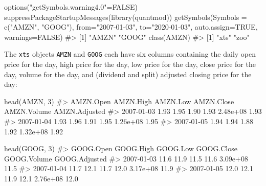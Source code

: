\documentclass[
  letterpaper,
  DIV=11,
  numbers=noendperiod]{scrreprt}
\newenvironment{Shaded}{\begin{snugshade}}{\end{snugshade}}
\newcommand{\AttributeTok}[1]{\textcolor[rgb]{0.40,0.45,0.13}{#1}}
\newcommand{\CommentTok}[1]{\textcolor[rgb]{0.37,0.37,0.37}{#1}}
\newcommand{\ConstantTok}[1]{\textcolor[rgb]{0.56,0.35,0.01}{#1}}
\newcommand{\DecValTok}[1]{\textcolor[rgb]{0.68,0.00,0.00}{#1}}
\newcommand{\FunctionTok}[1]{\textcolor[rgb]{0.28,0.35,0.67}{#1}}
\newcommand{\NormalTok}[1]{\textcolor[rgb]{0.00,0.23,0.31}{#1}}
\newcommand{\OtherTok}[1]{\textcolor[rgb]{0.00,0.23,0.31}{#1}}
\newcommand{\StringTok}[1]{\textcolor[rgb]{0.13,0.47,0.30}{#1}}
\theoremstyle{definition}
\theoremstyle{definition}
\theoremstyle{remark}
\begin{document}
\begin{Shaded}
\begin{Highlighting}[]
\FunctionTok{options}\NormalTok{(}\StringTok{"getSymbols.warning4.0"}\OtherTok{=}\ConstantTok{FALSE}\NormalTok{)}
\FunctionTok{suppressPackageStartupMessages}\NormalTok{(}\FunctionTok{library}\NormalTok{(quantmod))}
\FunctionTok{getSymbols}\NormalTok{(}\AttributeTok{Symbols =} \FunctionTok{c}\NormalTok{(}\StringTok{"AMZN"}\NormalTok{, }\StringTok{"GOOG"}\NormalTok{), }\AttributeTok{from=}\StringTok{"2007{-}01{-}03"}\NormalTok{, }\AttributeTok{to=}\StringTok{"2020{-}01{-}03"}\NormalTok{,}
           \AttributeTok{auto.assign=}\ConstantTok{TRUE}\NormalTok{, }\AttributeTok{warnings=}\ConstantTok{FALSE}\NormalTok{)}
\CommentTok{\#\textgreater{} [1] "AMZN" "GOOG"}
\FunctionTok{class}\NormalTok{(AMZN)}
\CommentTok{\#\textgreater{} [1] "xts" "zoo"}
\end{Highlighting}
\end{Shaded}

The \texttt{xts} objects \texttt{AMZN} and \texttt{GOOG} each have six
columns containing the daily open price for the day, high price for the
day, low price for the day, close price for the day, volume for the day,
and (dividend and split) adjusted closing price for the day:

\begin{Shaded}
\begin{Highlighting}[]
\FunctionTok{head}\NormalTok{(AMZN, }\DecValTok{3}\NormalTok{)}
\CommentTok{\#\textgreater{}            AMZN.Open AMZN.High AMZN.Low AMZN.Close AMZN.Volume AMZN.Adjusted}
\CommentTok{\#\textgreater{} 2007{-}01{-}03      1.93      1.95     1.90       1.93    2.48e+08          1.93}
\CommentTok{\#\textgreater{} 2007{-}01{-}04      1.93      1.96     1.91       1.95    1.26e+08          1.95}
\CommentTok{\#\textgreater{} 2007{-}01{-}05      1.94      1.94     1.88       1.92    1.32e+08          1.92}
\end{Highlighting}
\end{Shaded}

\begin{Shaded}
\begin{Highlighting}[]
\FunctionTok{head}\NormalTok{(GOOG, }\DecValTok{3}\NormalTok{)}
\CommentTok{\#\textgreater{}            GOOG.Open GOOG.High GOOG.Low GOOG.Close GOOG.Volume GOOG.Adjusted}
\CommentTok{\#\textgreater{} 2007{-}01{-}03      11.6      11.9     11.5       11.6    3.09e+08          11.5}
\CommentTok{\#\textgreater{} 2007{-}01{-}04      11.7      12.1     11.7       12.0    3.17e+08          11.9}
\CommentTok{\#\textgreater{} 2007{-}01{-}05      12.0      12.1     11.9       12.1    2.76e+08          12.0}
\end{Highlighting}
\end{Shaded}
\end{document}
